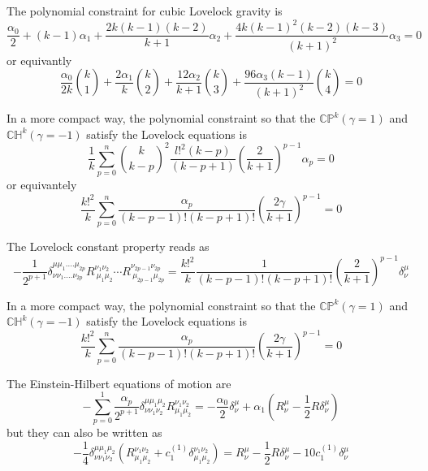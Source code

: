 The polynomial constraint for cubic Lovelock gravity is
\begin{equation*}
    \frac{\alpha_0}{2}+(k-1)\alpha_1+\frac{2k(k-1)(k-2)}{k+1}\alpha_2+\frac{4k(k-1)^2(k-2)(k-3)}{(k+1)^2}\alpha_3=0
\end{equation*}
or equivantly
\begin{equation*}
    \frac{\alpha_0}{2k}\binom{k}{1}+\frac{2\alpha_1}{k}\binom{k}{2}+\frac{12\alpha_2}{k+1}\binom{k}{3}+\frac{96\alpha_3(k-1)}{(k+1)^2}\binom{k}{4}=0
\end{equation*}

\begin{tcolorbox}
In a more compact way, the polynomial constraint so that the $\mathbb{CP}^k (\gamma=1)$ and $\mathbb{CH}^k (\gamma=-1)$ satisfy the Lovelock equations is
\begin{equation*}
    \frac{1}{k}\sum_{p=0}^n\binom{k}{k-p}^2\frac{l!^2(k-p)}{(k-p+1)}\left(\frac{2}{k+1}\right)^{p-1}\alpha_p=0
\end{equation*}
or equivantely
\begin{equation*}
    \frac{k!^2}{k}\sum_{p=0}^n\frac{\alpha_p}{(k-p-1)!(k-p+1)!}\left(\frac{2\gamma}{k+1}\right)^{p-1}=0
\end{equation*}
\end{tcolorbox}

The Lovelock constant property reads as
\begin{equation*}
    -\frac{1}{2^{p+1}}\delta^{\mu\mu_1....\mu_{2p}}_{\nu\nu_1....\nu_{2p}}R^{\nu_1\nu_2}_{\ \mu_1\mu_2}\cdots R^{\nu_{2p-1}\nu_{2p}}_{\ \mu_{2p-1}\mu_{2p}}=\frac{k!^2}{k}\frac{1}{(k-p-1)!(k-p+1)!}\left(\frac{2}{k+1}\right)^{p-1}\delta^\mu_\nu
\end{equation*}

\begin{tcolorbox}
In a more compact way, the polynomial constraint so that the $\mathbb{CP}^k (\gamma=1)$ and $\mathbb{CH}^k (\gamma=-1)$ satisfy the Lovelock equations is
\begin{equation*}
    \frac{k!^2}{k}\sum_{p=0}^n\frac{\alpha_p}{(k-p-1)!(k-p+1)!}\left(\frac{2\gamma}{k+1}\right)^{p-1}=0
\end{equation*}
\end{tcolorbox}

\newpage
The Einstein-Hilbert equations of motion are
\begin{equation*}
    -\sum_{p=0}^1\frac{\alpha_p}{2^{p+1}}\delta^{\mu\mu_1\mu_2}_{\nu\nu_1\nu_2}R^{\nu_1\nu_2}_{\mu_1\mu_2}=-\frac{\alpha_0}{2}\delta^\mu_\nu+\alpha_1\left(R^\mu_\nu-\frac{1}{2}R\delta^\mu_\nu\right)
\end{equation*}
but they can also be written as
\begin{equation*}
    -\frac{1}{4}\delta^{\mu\mu_1\mu_2}_{\nu\nu_1\nu_2}\left(R^{\nu_1\nu_2}_{\mu_1\mu_2}+c_1^{(1)}\delta^{\nu_1\nu_2}_{\mu_1\mu_2}\right)=R^\mu_\nu-\frac{1}{2}R\delta^\mu_\nu-10c_1^{(1)}\delta^\mu_\nu
\end{equation*}

